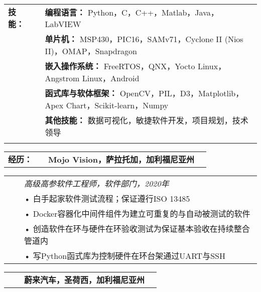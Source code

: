 \documentclass{minimal}
\begin{document}
\begin{CJK*}{UTF8}{gbsn}


\begin{center}
\fontsize{14}{12.8}\selectfont
\name\\
\fontsize{10}{12}\selectfont
\address\\
\phone\\
\email\\
\github\\
\end{center}
\vspace{0.5cm}

\begin{tabular}{ p{1.5cm} p{1cm} p{16cm} }
\textbf{技能：} & & \textbf{编程语言：} Python，C，C++，Matlab，Java，LabVIEW\\
& & \textbf{单片机：} MSP430，PIC16，SAMv71，Cyclone II (Nios II)，OMAP，Snapdragon\\
& & \textbf{嵌入操作系统：} FreeRTOS，QNX，Yocto Linux，Angstrom Linux，Android\\
& & \textbf{函式库与软体框架：} OpenCV，PIL，D3，Matplotlib，Apex Chart，Scikit-learn，Numpy\\
& & \textbf{其他技能：} 数据可视化，敏捷软件开发，项目规划，技术领导\\
& & \\
\end{tabular}

\begin{tabular}{ p{1.5cm} p{1cm} p{16cm} >{\raggedleft\arraybackslash}p{3cm} }
\textbf{经历：} & & \textbf{Mojo Vision，萨拉托加，加利福尼亚州} & \\
\end{tabular}

\begin{tabular}{ p{1.5cm} p{1cm} p{16cm} }
& & \textit{高级高参软件工程师，软件部门，2020年}\\
& & • 白手起家软件测试流程；保证遵行ISO 13485\\
& & • Docker容器化中间件组件为建立可重复的与自动被测试的软件\\
& & • 创造软件在环与硬件在环验收测试为保证基本验收在持续整合管道内\\
& & • 写Python函式库为控制硬件在环台架通过UART与SSH\\
\end{tabular}

\begin{tabular}{ p{1.5cm} p{1cm} p{16cm} >{\raggedleft\arraybackslash}p{3cm} }
& & \textbf{蔚来汽车，圣荷西，加利福尼亚州} & \\
\end{tabular}


\end{CJK*}
\end{document}
